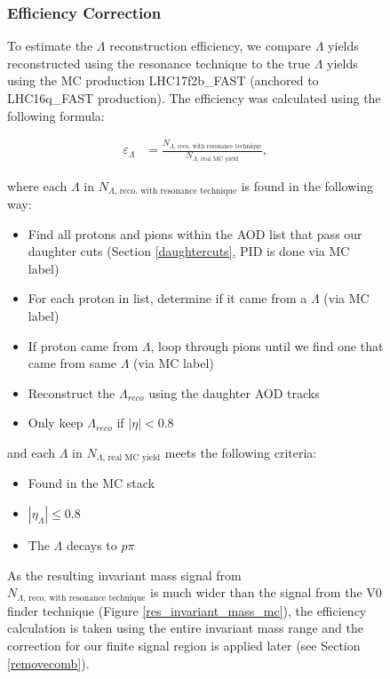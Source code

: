 \documentclass[ALICE,manyauthors]{ALICE_analysis_notes}
\begin{document}
\begin{figure}[ht]
\subsubsection{Efficiency Correction}
To estimate the $\Lambda$ reconstruction efficiency, we compare $\Lambda$ yields reconstructed using the resonance technique to the true $\Lambda$ yields using the MC production LHC17f2b\_FAST (anchored to LHC16q\_FAST production). The efficiency was calculated using the following formula:

\begin{align*}
	\varepsilon_{\Lambda} &=  \frac{N_{\Lambda\text{, reco. with resonance technique}}}{N_{\Lambda\text{, real MC yield}}},
\end{align*}

where each $\Lambda$ in $N_{\Lambda\text{, reco. with resonance technique}}$ is found in the following way:

\begin{itemize}
	\item Find all protons and pions within the AOD list that pass our daughter cuts (Section \ref{daughtercuts}, PID is done via MC label)
	\item For each proton in list, determine if it came from a $\Lambda$ (via MC label)
	\item If proton came from $\Lambda$, loop through pions until we find one that came from same $\Lambda$ (via MC label)
	\item Reconstruct the $\Lambda_{reco}$ using the daughter AOD tracks
	\item Only keep $\Lambda_{reco}$ if $|\eta| < 0.8$
\end{itemize}

and each $\Lambda$ in $N_{\Lambda\text{, real MC yield}}$ meets the following criteria:

\begin{itemize}
	\item Found in the MC stack
	\item $|\eta_{\Lambda}| \leq 0.8$
	\item The $\Lambda$ decays to $p\pi$
\end{itemize}

As the resulting invariant mass signal from $N_{\Lambda\text{, reco. with resonance technique}}$ is much wider than the signal from the V0 finder technique (Figure \ref{res_invariant_mass_mc}), the efficiency calculation is taken using the entire invariant mass range and the correction for our finite signal region is applied later (see Section \ref{removecomb}).


\end{figure}
\end{document}
